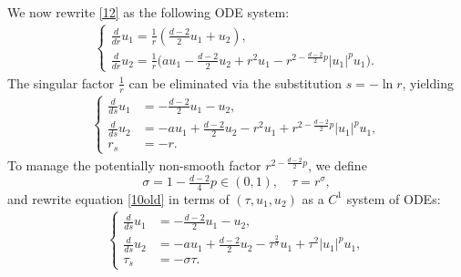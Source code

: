 \documentclass[12pt]{amsart}
\begin{document}
We now rewrite \eqref{12} as the following ODE system: 
\begin{align}\label{9}
\begin{cases}
\tfrac d{dr} u_1=\tfrac 1r(\tfrac{d-2}2 u_1+u_2),\\
\tfrac d{dr} u_2=\tfrac 1r \big(au_1-\tfrac{d-2}2 u_2+r^2 u_1-r^{2-\tfrac{d-2}2p}|u_1|^{p}u_1\big). 
\end{cases}
\end{align}
The singular factor $\frac 1r$ can be eliminated via the substitution $s=-\ln r$, yielding
\begin{align}\label{10old}
\begin{cases}
\tfrac d{ds}u_1&=-\tfrac {d-2}2 u_1-u_2, \\
\tfrac d{ds}u_2&=-au_1+\frac{d-2}2 u_2-r^2 u_1+r^{2-\frac{d-2}2p}|u_1|^{p}u_1,\\
r_s&=-r. 
\end{cases}
\end{align}
To manage the potentially non-smooth factor $r^{2-\frac{d-2}2p}$, we define 
\[\sigma=1-\tfrac{d-2}4p \in (0, 1),\quad \tau=r^{\sigma}, 
\] 
and rewrite equation \eqref{10old} in terms of $(\tau, u_1, u_2)$ as a $C^1$ system of ODEs:
\begin{align}\label{35}
\begin{cases}
\tfrac d{ds}u_1&=-\tfrac {d-2}2 u_1-u_2, \\
\tfrac d{ds}u_2&=-au_1+\frac{d-2}2 u_2-\tau^{\frac 2\sigma} u_1+\tau^2|u_1|^{p}u_1,\\
\tau_s&=-\sigma \tau. 
\end{cases}
\end{align}
\end{document}
